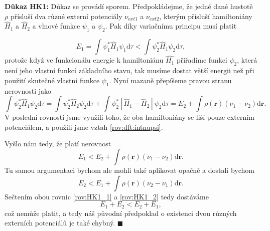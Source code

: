 \bigskip 
\textbf{Důkaz HK1:} Důkaz se provádí sporem. Předpokládejme, že jedné dané hustotě $\rho$ přísluší dva různé externí potenciály $\nu_{ext1}$ a $\nu_{ext2}$, kterým přísluší hamiltoniány $\hat{H}_1$ a $\hat{H}_2$ a vlnové funkce $\psi_1$ a $\psi_2$.  Pak díky variačnímu principu musí platit

\begin{equation}
E_1 = \int \psi_1^* \hat{H}_1 \psi_1 \mathrm{d}\tau < \int \psi_2^* \hat{H}_1 \psi_2 \mathrm{d}\tau ,
\end{equation}
protože když ve funkcionálu energie k hamiltoniánu $\hat{H_1}$ přiřadíme funkci $\psi_2$, která není jeho vlastní funkcí základního stavu, tak musíme dostat větší energii než při použití skutečné vlastní funkce $\psi_1$. Nyní mazaně přepíšeme pravou stranu nerovnosti jako  
\begin{equation}
\int \psi_2^* \hat{H}_1 \psi_2 \mathrm{d}\tau = \int \psi_2^* \hat{H}_2 \psi_2\mathrm{d}\tau  + \int \psi_2^* \left[\hat{H}_1-\hat{H}_2\right] \psi_2\mathrm{d}\tau = E_2 + \int \rho(\mathbf{r})(\nu_1-\nu_2)\mathrm{d}\mathbf{r}.
\end{equation}
V poslední rovnosti jsme využili toho, že oba hamiltoniány se liší pouze externím potenciálem, a použili jsme vztah \eqref{rov:dft:intnupsi}.

\noindent Vyšlo nám tedy, že platí nerovnost
\begin{equation}
E_1 < E_2+\int \rho(\mathbf{r})(\nu_1-\nu_2)\mathrm{d}\mathbf{r}.
\label{rov:HK1_1}
\end{equation}
Tu samou argumentaci bychom ale mohli také aplikovat opačně a dostali bychom
\begin{equation}
E_2 < E_1+\int \rho(\mathbf{r})(\nu_2-\nu_1)\mathrm{d}\mathbf{r} .
\label{rov:HK1_2}
\end{equation}
Sečtením obou rovnic \eqref{rov:HK1_1} a \eqref{rov:HK1_2} tedy dostáváme
\begin{equation}
E_1 + E_2 < E_2 + E_1 ,
\end{equation}
což nemůže platit, a tedy náš původní předpoklad o existenci dvou různých externích potenciálů je také chybný.
\hfill {\footnotesize $\blacksquare$}

